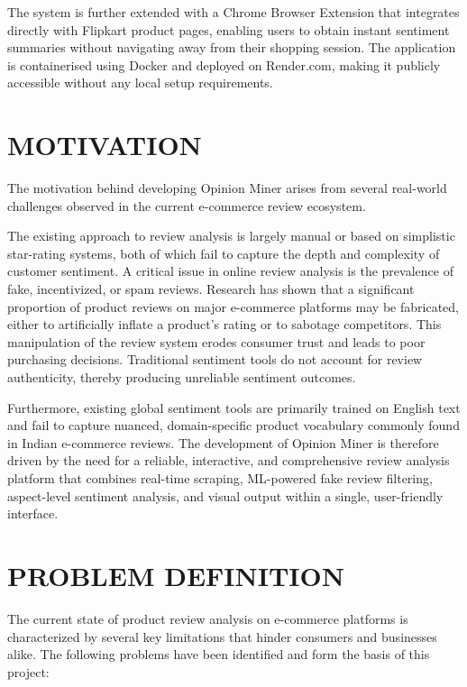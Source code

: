 \documentclass[12pt,a4paper]{report}
\begin{document}
The system is further extended with a Chrome Browser Extension that integrates directly with Flipkart product pages, enabling users to obtain instant sentiment summaries without navigating away from their shopping session. The application is containerised using Docker and deployed on Render.com, making it publicly accessible without any local setup requirements.

\section{MOTIVATION}

The motivation behind developing Opinion Miner arises from several real-world challenges observed in the current e-commerce review ecosystem.

The existing approach to review analysis is largely manual or based on simplistic star-rating systems, both of which fail to capture the depth and complexity of customer sentiment. A critical issue in online review analysis is the prevalence of fake, incentivized, or spam reviews. Research has shown that a significant proportion of product reviews on major e-commerce platforms may be fabricated, either to artificially inflate a product's rating or to sabotage competitors. This manipulation of the review system erodes consumer trust and leads to poor purchasing decisions. Traditional sentiment tools do not account for review authenticity, thereby producing unreliable sentiment outcomes.

Furthermore, existing global sentiment tools are primarily trained on English text and fail to capture nuanced, domain-specific product vocabulary commonly found in Indian e-commerce reviews. The development of Opinion Miner is therefore driven by the need for a reliable, interactive, and comprehensive review analysis platform that combines real-time scraping, ML-powered fake review filtering, aspect-level sentiment analysis, and visual output within a single, user-friendly interface.

\section{PROBLEM DEFINITION}

The current state of product review analysis on e-commerce platforms is characterized by several key limitations that hinder consumers and businesses alike. The following problems have been identified and form the basis of this project:
\end{document}
